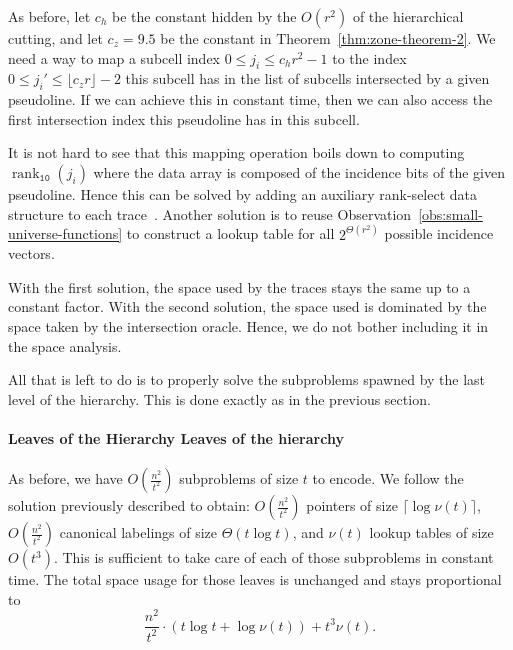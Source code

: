 As before, let \(c_h\) be the constant hidden by the \(O(r^2)\) of the
hierarchical cutting, and let \(c_z = 9.5\) be the constant in
Theorem~\ref{thm:zone-theorem-2}.
We need a way to map a subcell index \(0 \leq j_i \leq c_h r^2 - 1\) to the
index \(0 \leq j_i' \leq \lfloor c_z r \rfloor - 2\) this subcell has in the
list of subcells intersected by a given pseudoline. If we can achieve this in
constant time, then we can also access the first intersection index this
pseudoline has in this subcell.

It is not hard to see that this mapping operation boils down to computing
\(\operatorname{rank}_{\texttt{10}}(j_i)\) where the data array is composed of
the incidence bits of the given pseudoline. Hence this can be solved by adding
an auxiliary rank-select data structure to each trace~\cite{RRS07,BH17}.
Another solution is to reuse Observation~\ref{obs:small-universe-functions} to
construct a lookup table for all \(2^{\Theta(r^2)}\) possible incidence
vectors.

With the first solution, the space used by the traces stays the same up to a
constant factor. With the second solution, the space used is dominated by the
space taken by the intersection oracle. Hence, we do not bother including it in
the space analysis.


All that is left to do is to properly solve the subproblems spawned by the last
level of the hierarchy. This is done exactly as in the previous section.
%
\paragraph*{\iftitlecase%
Leaves of the Hierarchy\else%
Leaves of the hierarchy\fi}
%
As before, we have \(O(\frac{n^2}{t^2})\) subproblems of size \(t\) to encode.
We follow the solution previously described to obtain:
\(O(\frac{n^2}{t^2})\) pointers of size \(\lceil \log{\nu(t)} \rceil\),
\(O(\frac{n^2}{t^2})\) canonical labelings of size \(\Theta(t \log t)\),
and \(\nu(t)\) lookup tables of size \(O(t^3)\).
%
This is sufficient to take care of each of those subproblems in constant time.
The total space usage for those leaves is unchanged and stays proportional to
\begin{displaymath}
  \frac{n^2}{t^2} \cdot (t \log t + \log{\nu(t)}) + t^3 \nu(t).
\end{displaymath}

